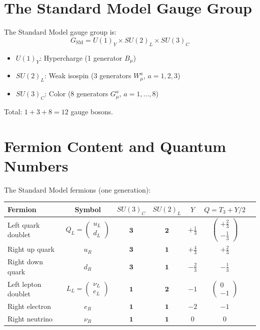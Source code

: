 \documentclass[11pt,a4paper,openright]{book}
\theoremstyle{plain}
\theoremstyle{definition}
\newcommand{\SM}{\mathrm{SM}}
\begin{document}
\section{The Standard Model Gauge Group}

The Standard Model gauge group is:
\begin{equation}
G_{\SM} = U(1)_Y \times SU(2)_L \times SU(3)_C
\end{equation}

\begin{itemize}
    \item $U(1)_Y$: Hypercharge (1 generator $B_\mu$)
    \item $SU(2)_L$: Weak isospin (3 generators $W^a_\mu$, $a = 1,2,3$)
    \item $SU(3)_C$: Color (8 generators $G^a_\mu$, $a = 1,\ldots,8$)
\end{itemize}

Total: $1 + 3 + 8 = 12$ gauge bosons.

\section{Fermion Content and Quantum Numbers}

The Standard Model fermions (one generation):

\begin{center}
\begin{tabular}{lcccccc}
\toprule
\textbf{Fermion} & \textbf{Symbol} & $SU(3)_C$ & $SU(2)_L$ & $Y$ & $Q = T_3 + Y/2$ \\
\midrule
Left quark doublet & $Q_L = \begin{pmatrix} u_L \\ d_L \end{pmatrix}$ & $\mathbf{3}$ & $\mathbf{2}$ & $+\frac{1}{3}$ & $\begin{pmatrix} +\frac{2}{3} \\ -\frac{1}{3} \end{pmatrix}$ \\[0.3cm]
Right up quark & $u_R$ & $\mathbf{3}$ & $\mathbf{1}$ & $+\frac{4}{3}$ & $+\frac{2}{3}$ \\[0.1cm]
Right down quark & $d_R$ & $\mathbf{3}$ & $\mathbf{1}$ & $-\frac{2}{3}$ & $-\frac{1}{3}$ \\[0.1cm]
\midrule
Left lepton doublet & $L_L = \begin{pmatrix} \nu_L \\ e_L \end{pmatrix}$ & $\mathbf{1}$ & $\mathbf{2}$ & $-1$ & $\begin{pmatrix} 0 \\ -1 \end{pmatrix}$ \\[0.3cm]
Right electron & $e_R$ & $\mathbf{1}$ & $\mathbf{1}$ & $-2$ & $-1$ \\[0.1cm]
Right neutrino & $\nu_R$ & $\mathbf{1}$ & $\mathbf{1}$ & $0$ & $0$ \\
\bottomrule
\end{tabular}
\end{center}
\end{document}
